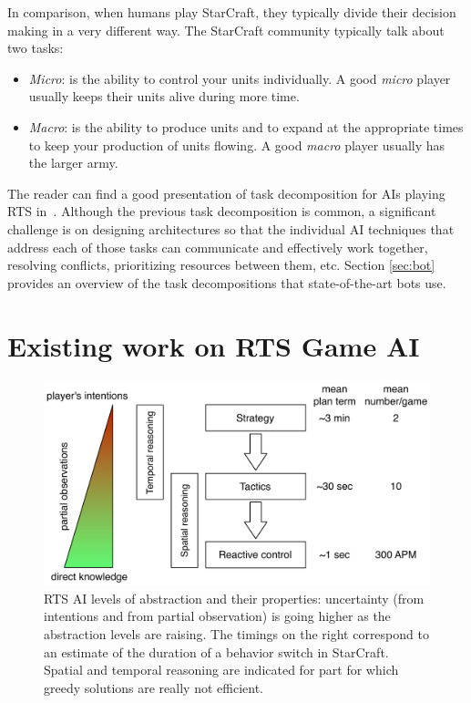 \documentclass[journal]{IEEEtran}
\begin{document}
In comparison, when humans play StarCraft, they typically divide their decision making in a very different way. The StarCraft community typically talk about two tasks:
\begin{itemize}
  \item {\em Micro}: is the ability to control your units individually. A good \emph{micro} player usually keeps their units alive during more time.
  \item {\em Macro}: is the ability to produce units and to expand at the appropriate times to keep your production of units flowing. A good \emph{macro} player usually has the larger army.
\end{itemize}

The reader can find a  good presentation of task decomposition for AIs
playing RTS in~\cite{weber2011acs}. Although the previous task decomposition is common, a significant challenge is on designing architectures so that the individual AI techniques that address each of those tasks can communicate and effectively work together, resolving conflicts, prioritizing resources between them, etc. Section \ref{sec:bot} provides an overview of the task decompositions that state-of-the-art bots use.


\section{Existing work on RTS Game AI}\label{sec:review}

\begin{figure}
    \centering
    \includegraphics[width=0.9\columnwidth]{figures/levels_abstraction.pdf}
    \caption{RTS AI levels of abstraction and their properties: uncertainty (from intentions and from partial observation) is going higher as the abstraction levels are raising. The timings on the right correspond to an estimate of the duration of a behavior switch in StarCraft. Spatial and temporal reasoning are indicated for part for which greedy solutions are really not efficient.}
    \label{fig:levels-abstraction}
\end{figure}
\end{document}

